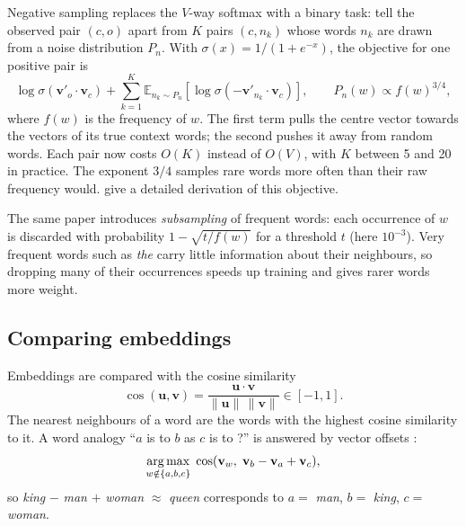 Negative sampling \citep{mikolov2013distributed} replaces the $V$-way softmax with a binary task: tell the observed pair $(c, o)$ apart from $K$ pairs $(c, n_k)$ whose words $n_k$ are drawn from a noise distribution $P_n$. With $\sigma(x) = 1 / (1 + e^{-x})$, the objective for one positive pair is
\begin{equation}
    \log \sigma(\mathbf{v}'_o \cdot \mathbf{v}_c) + \sum_{k=1}^{K} \mathbb{E}_{n_k \sim P_n} \left[ \log \sigma(-\mathbf{v}'_{n_k} \cdot \mathbf{v}_c) \right],
    \qquad
    P_n(w) \propto f(w)^{3/4},
    \label{eq:sgns}
\end{equation}
where $f(w)$ is the frequency of $w$. The first term pulls the centre vector towards the vectors of its true context words; the second pushes it away from random words. Each pair now costs $O(K)$ instead of $O(V)$, with $K$ between 5 and 20 in practice. The exponent $3/4$ samples rare words more often than their raw frequency would. \citet{goldberg2014word2vec} give a detailed derivation of this objective.

The same paper introduces \emph{subsampling} of frequent words: each occurrence of $w$ is discarded with probability $1 - \sqrt{t / f(w)}$ for a threshold $t$ (here $10^{-3}$). Very frequent words such as \textit{the} carry little information about their neighbours, so dropping many of their occurrences speeds up training and gives rarer words more weight.

\subsection{Comparing embeddings}

Embeddings are compared with the cosine similarity
\begin{equation}
    \cos(\mathbf{u}, \mathbf{v}) = \frac{\mathbf{u} \cdot \mathbf{v}}{\lVert \mathbf{u} \rVert \, \lVert \mathbf{v} \rVert} \in [-1, 1] .
\end{equation}
The nearest neighbours of a word are the words with the highest cosine similarity to it. A word analogy ``$a$ is to $b$ as $c$ is to ?'' is answered by vector offsets \citep{mikolov2013linguistic}:
\begin{equation}
    \operatorname*{arg\,max}_{w \notin \{a, b, c\}} \; \cos(\mathbf{v}_w, \; \mathbf{v}_b - \mathbf{v}_a + \mathbf{v}_c),
    \label{eq:analogy}
\end{equation}
so \textit{king} $-$ \textit{man} $+$ \textit{woman} $\approx$ \textit{queen} corresponds to $a = $ \textit{man}, $b = $ \textit{king}, $c = $ \textit{woman}.
